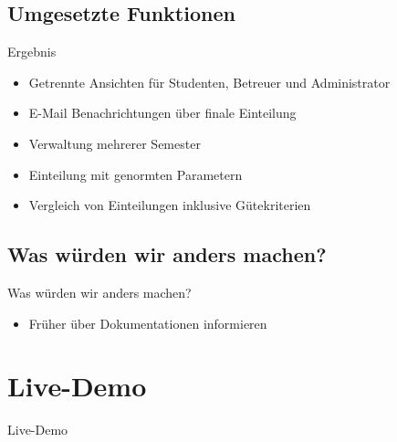 \documentclass[18pt]{beamer}
\begin{document}
\subsection{Umgesetzte Funktionen}
\begin{frame}{Ergebnis} 
\begin{itemize}
 \item Getrennte Ansichten für Studenten, Betreuer und Administrator
 \item E-Mail Benachrichtungen über finale Einteilung
 \item Verwaltung mehrerer Semester
 \item Einteilung mit genormten Parametern
 \item Vergleich von Einteilungen inklusive Gütekriterien
\end{itemize}
\end{frame}

\subsection{Was würden wir anders machen?}
\begin{frame}{Was würden wir anders machen?}
 \begin{itemize}
  \item Früher über Dokumentationen informieren
 \end{itemize}

\end{frame}


\section{Live-Demo}
\begin{frame}
 \begin{center}
  \Huge Live-Demo
 \end{center}
\end{frame}
\end{document}
